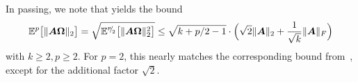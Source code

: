 In passing, we note that   yields the bound
    \begin{equation}
        \mathbb{E}^{p}\big[ \lVert \boldsymbol{A} \boldsymbol{\Omega} \rVert _2 \big] = \sqrt{\mathbb{E}^{{}^{p}{\mskip -5mu/\mskip -3mu}_{2}}\big[ \lVert \boldsymbol{A} \boldsymbol{\Omega} \rVert _2^2 \big]} \leq \sqrt{k + p/2-1} \cdot \Big(\sqrt{2} \lVert \boldsymbol{A} \rVert _2 + \frac{1}{\sqrt{k}}\lVert \boldsymbol{A} \rVert_F\Big)
    \end{equation}
    with $k\ge 2, p\ge 2$. For $p = 2$, this nearly matches the corresponding bound from~\cite[Lemma B.1]{tropp-2023-randomized-algorithms}, except for the additional factor $\sqrt{2}$.

%
%
%
